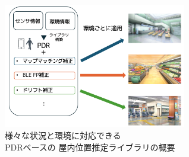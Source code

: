 \begin{figure}[h]
	\centering
	\includegraphics[width=80mm]{image/first.png}
	\caption{様々な状況と環境に対応できる\\PDRベースの
		屋内位置推定ライブラリの概要}    \label{fig:overview}
\end{figure}



